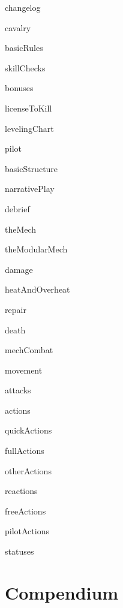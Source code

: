\documentclass{article}
\begin{document}
{changelog}  
\newpage
        

\tableofcontents
\newpage


{cavalry}    
\newpage

{basicRules}    
\newpage

{skillChecks}    
\newpage

{bonuses}    
\newpage

{licenseToKill}    
\newpage

{levelingChart}    
\newpage

{pilot}    
\newpage

{basicStructure}    
\newpage

{narrativePlay}    
\newpage

{debrief}    
\newpage

{theMech}    
\newpage

{theModularMech}    
\newpage

{damage}    
\newpage

{heatAndOverheat}    
\newpage

{repair}    
\newpage

{death}    
\newpage

{mechCombat}    
\newpage

{movement}    
\newpage

{attacks}    
\newpage

{actions}    
\newpage

{quickActions}
\newpage

{fullActions}    
\newpage

{otherActions}    
\newpage

{reactions}    
\newpage

{freeActions}    
\newpage

{pilotActions}    
\newpage

{statuses}    
\newpage
\section{Compendium}
\newpage
\end{document}
